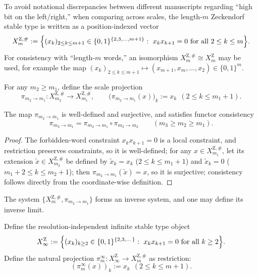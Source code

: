 \begin{definition}\label{def:XmZ-indexed}
To avoid notational discrepancies between different manuscripts regarding ``high bit on the left/right,'' when comparing across scales, the length-$m$ Zeckendorf stable type is written as a position-indexed vector
\[
X_m^{\mathrm Z,\#}:=\Bigl\{(x_k)_{2\le k\le m+1}\in\{0,1\}^{\{2,3,\dots,m+1\}}:\ x_kx_{k+1}=0\ \text{for all}\ 2\le k\le m\Bigr\}.
\]
For consistency with ``length-$m$ words,'' an isomorphism $X_m^{\mathrm Z,\#}\cong X_m^{\mathrm Z}$ may be used, for example the map $(x_k)_{2\le k\le m+1}\mapsto (x_{m+1},x_m,\dots,x_2)\in\{0,1\}^m$.
\end{definition}

\begin{definition}\label{def:pi-m2-m1}
For any $m_2\ge m_1$, define the scale projection
\[
\pi_{m_2\to m_1}:X_{m_2}^{\mathrm Z,\#}\to X_{m_1}^{\mathrm Z,\#},\qquad
\bigl(\pi_{m_2\to m_1}(x)\bigr)_k:=x_k\ \ (2\le k\le m_1+1).
\]
\end{definition}

\begin{lemma}\label{lem:pi-well-defined-surj}
The map $\pi_{m_2\to m_1}$ is well-defined and surjective, and satisfies functor consistency
\[
\pi_{m_3\to m_1}=\pi_{m_2\to m_1}\circ \pi_{m_3\to m_2}\qquad (m_3\ge m_2\ge m_1).
\]
\end{lemma}

\begin{proof}
The forbidden-word constraint $x_kx_{k+1}=0$ is a local constraint, and restriction preserves constraints, so it is well-defined; for any $x\in X_{m_1}^{\mathrm Z,\#}$, let its extension $\tilde x\in X_{m_2}^{\mathrm Z,\#}$ be defined by $\tilde x_k=x_k$ ($2\le k\le m_1+1$) and $\tilde x_k=0$ ($m_1+2\le k\le m_2+1$); then $\pi_{m_2\to m_1}(\tilde x)=x$, so it is surjective; consistency follows directly from the coordinate-wise definition.
\end{proof}

The system $\{X_m^{\mathrm Z,\#},\pi_{m_2\to m_1}\}$ forms an inverse system, and one may define its inverse limit.

\begin{definition}\label{def:XinfZ}
Define the resolution-independent infinite stable type object
\[
X_\infty^{\mathrm Z}:=\Bigl\{(x_k)_{k\ge 2}\in\{0,1\}^{\{2,3,\dots\}}:\ x_kx_{k+1}=0\ \text{for all}\ k\ge 2\Bigr\}.
\]
Define the natural projection $\pi_m^\infty:X_\infty^{\mathrm Z}\to X_m^{\mathrm Z,\#}$ as restriction:
\[
(\pi_m^\infty(x))_k:=x_k\ \ (2\le k\le m+1).
\]
\end{definition}

